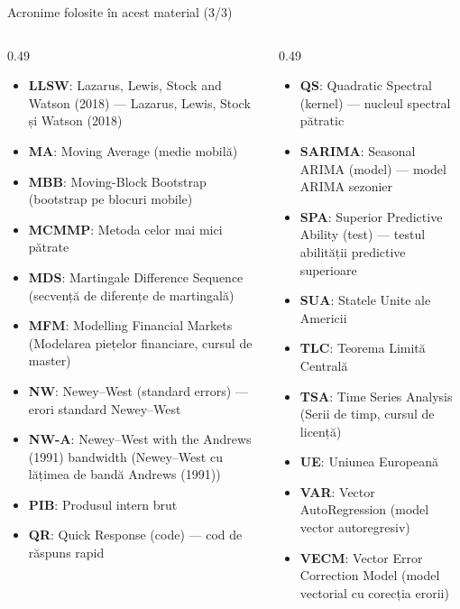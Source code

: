 \begin{frame}{Acronime folosite în acest material (3/3)}
\begin{columns}[T]
\begin{column}{0.49\textwidth}
\begin{itemize}\setlength{\itemsep}{0pt}
    \item \textbf{LLSW}: Lazarus, Lewis, Stock and Watson (2018) — Lazarus, Lewis, Stock și Watson (2018)
    \item \textbf{MA}: Moving Average (medie mobilă)
    \item \textbf{MBB}: Moving-Block Bootstrap (bootstrap pe blocuri mobile)
    \item \textbf{MCMMP}: Metoda celor mai mici pătrate
    \item \textbf{MDS}: Martingale Difference Sequence (secvență de diferențe de martingală)
    \item \textbf{MFM}: Modelling Financial Markets (Modelarea piețelor financiare, cursul de master)
    \item \textbf{NW}: Newey–West (standard errors) — erori standard Newey–West
    \item \textbf{NW-A}: Newey–West with the Andrews (1991) bandwidth (Newey–West cu lățimea de bandă Andrews (1991))
    \item \textbf{PIB}: Produsul intern brut
    \item \textbf{QR}: Quick Response (code) — cod de răspuns rapid
\end{itemize}
\end{column}
\begin{column}{0.49\textwidth}
\begin{itemize}\setlength{\itemsep}{0pt}
    \item \textbf{QS}: Quadratic Spectral (kernel) — nucleul spectral pătratic
    \item \textbf{SARIMA}: Seasonal ARIMA (model) — model ARIMA sezonier
    \item \textbf{SPA}: Superior Predictive Ability (test) — testul abilității predictive superioare
    \item \textbf{SUA}: Statele Unite ale Americii
    \item \textbf{TLC}: Teorema Limită Centrală
    \item \textbf{TSA}: Time Series Analysis (Serii de timp, cursul de licență)
    \item \textbf{UE}: Uniunea Europeană
    \item \textbf{VAR}: Vector AutoRegression (model vector autoregresiv)
    \item \textbf{VECM}: Vector Error Correction Model (model vectorial cu corecția erorii)
\end{itemize}
\end{column}
\end{columns}
\end{frame}

